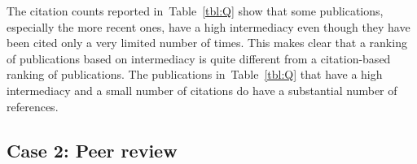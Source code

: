 \documentclass[9pt,twocolumn,twoside]{pnas-alt} %
\theoremstyle{definition}
\newcommand{\tblref}[1]{Table~\ref{tbl:#1}\xspace}
\begin{document}
The citation counts reported in~\tblref{Q} show that some publications, especially the more recent ones, have a high intermediacy even though they have been cited only a very limited number of times. This makes clear that a ranking of publications based on intermediacy is quite different from a citation-based ranking of publications. The publications in~\tblref{Q} that have a high intermediacy and a small number of citations do have a substantial number of references.

%
%

\subsection*{\label{sec:pr}Case 2: Peer review}
\end{document}
